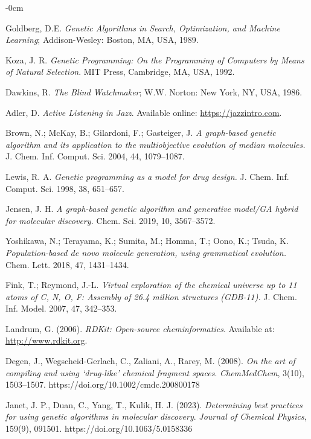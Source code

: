 \documentclass[life,article,submit,pdftex,moreauthors]{Definitions/mdpi}
\begin{document}
\begin{adjustwidth}{-\extralength}{0cm}
{\begin{thebibliography}{999}
Goldberg, D.E. \textit{Genetic Algorithms in Search, Optimization, and Machine Learning}; Addison-Wesley: Boston, MA, USA, 1989.

Koza, J. R.
\textit{Genetic Programming: On the Programming of Computers by Means of Natural Selection}.
MIT Press, Cambridge, MA, USA, 1992.

Dawkins, R. \textit{The Blind Watchmaker}; W.W. Norton: New York, NY, USA, 1986.

Adler, D. \textit{Active Listening in Jazz}. Available online: \url{https://jazzintro.com}.

Brown, N.; McKay, B.; Gilardoni, F.; Gasteiger, J.
\textit{A graph-based genetic algorithm and its application to the multiobjective
evolution of median molecules.}
J. Chem. Inf. Comput. Sci. 2004, 44, 1079--1087.

Lewis, R. A.
\textit{Genetic programming as a model for drug design.}
J. Chem. Inf. Comput. Sci. 1998, 38, 651--657.

Jensen, J. H.
\textit{A graph-based genetic algorithm and generative model/GA hybrid for molecular discovery.}
Chem. Sci. 2019, 10, 3567--3572.

Yoshikawa, N.; Terayama, K.; Sumita, M.; Homma, T.; Oono, K.; Tsuda, K.
\textit{Population-based de novo molecule generation, using grammatical evolution.}
Chem. Lett. 2018, 47, 1431--1434.

Fink, T.; Reymond, J.-L.
\textit{Virtual exploration of the chemical universe up to 11 atoms of C, N, O, F:
Assembly of 26.4 million structures (GDB-11).}
J. Chem. Inf. Model. 2007, 47, 342--353.

Landrum, G. (2006). \textit{RDKit: Open-source cheminformatics}. Available at: \url{http://www.rdkit.org}.

Degen, J., Wegscheid-Gerlach, C., Zaliani, A., Rarey, M. (2008).
\textit{On the art of compiling and using ‘drug-like’ chemical fragment spaces}.
\textit{ChemMedChem}, 3(10), 1503–1507. https://doi.org/10.1002/cmdc.200800178

Janet, J. P., Duan, C., Yang, T., Kulik, H. J. (2023).
\textit{Determining best practices for using genetic algorithms in molecular discovery}.
\textit{Journal of Chemical Physics}, 159(9), 091501. https://doi.org/10.1063/5.0158336


\end{thebibliography}}
\end{adjustwidth}
\end{document}
